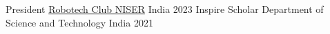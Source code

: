 


\begin{cvhonors}

   \cvhonor
	{President} %
	{\href{https://www.niser.ac.in/~smishra/club/rtc/}{Robotech Club NISER}} %
	{India} %
	{2023} %
   \cvhonor
	{Inspire Scholar} %
	{Department of Science and Technology} %
	{India} %
	{2021} %

\end{cvhonors}